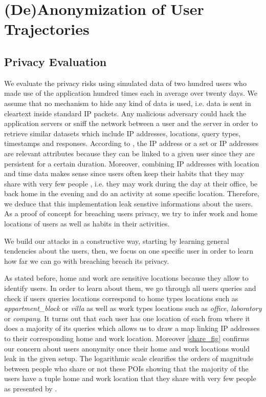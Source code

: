 \documentclass[10pt,conference,compsocconf]{IEEEtran}
\begin{document}
\section{(De)Anonymization of User Trajectories}

\subsection{Privacy Evaluation}
We evaluate the privacy risks using simulated data of two hundred users who made use of the application hundred times each in average over twenty days. We assume that no mechanism to hide any kind of data is used, i.e. data is sent in cleartext inside standard IP packets. Any malicious adversary could hack the application servers or sniff the network between a user and the server in order to retrieve similar datasets which include IP addresses, locations, query types, timestamps and responses. According to \cite{dont}, the IP address or a set or IP addresses are relevant attributes because they can be linked to a given user since they are persistent for a certain duration. Moreover, combining IP addresses with location and time data makes sense since users often keep their habits that they may share with very few people \cite{on}, i.e. they may work during the day at their office, be back home in the evening and do an activity at some specific location. Therefore, we deduce that this implementation leak senstive informations about the users. As a proof of concept for breaching users privacy, we try to infer work and home locations of users as well as habits in their activities.

We build our attacks in a constructive way, starting by learning general tendencies about the users, then, we focus on one specific user in order to learn how far we can go with breaching breach its privacy.

As stated before, home and work are sensitive locations because they allow to identify users. In order to learn about them, we go through all users queries and check if users queries locations correspond to home types locations such as \textit{appartment\_block} or \textit{villa} as well as work types locations such as \textit{office}, \textit{laboratory} or \textit{company}. It turns out that each user has one location of each from where it does a majority of its queries which allows us to draw a map linking IP addresses to their corresponding home and work location. Moreover \ref{share_fig} confirms our concern about users anonymity once their home and work locations would leak in the given setup. The logarithmic scale clearifies the orders of magnitude between people who share or not these POIs showing that the majority of the users have a tuple home and work location that they share with very few people as presented by \cite{on}.
\end{document}
